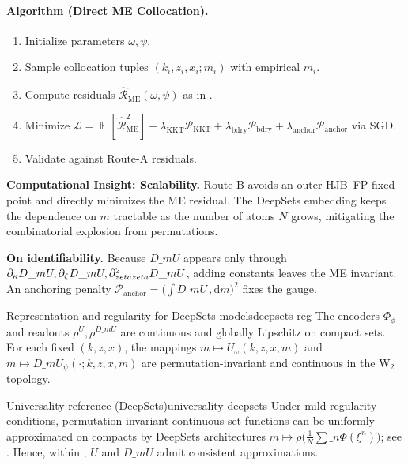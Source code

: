 ﻿\documentclass[11pt,letterpaper,oneside]{article}
\numberwithin{equation}{section}
\DeclareMathOperator{\E}{\mathbb{E}}
\newcommand{\1}{\mathbf{1}}
\newcommand{\diff}{,\mathrm{d}}
\newcommand{\dmU}{D\_m U}
\newcommand{\Dm}{D\_m}
\begin{document}
\paragraph{Algorithm (Direct ME Collocation).}
\begin{enumerate}[leftmargin=1.5em,label=\textbf{B.\arabic*}]
\item Initialize parameters $\omega,\psi$.
\item Sample collocation tuples $(k_i,z_i,x_i; m_i)$ with empirical $m_i$.
\item Compute residuals $\widehat{\mathcal{R}}_{\mathrm{ME}}(\omega,\psi)$ as in .
\item Minimize $\mathcal{L}=\E[\widehat{\mathcal{R}}_{\mathrm{ME}}^2]+\lambda_{\mathrm{KKT}}\mathcal{P}_{\mathrm{KKT}}+\lambda_{\mathrm{bdry}}\mathcal{P}_{\mathrm{bdry}}+\lambda_{\mathrm{anchor}}\mathcal{P}_{\mathrm{anchor}}$ via SGD.
\item Validate against Route-A residuals.
\end{enumerate}

\begin{tcolorbox}[mathstyle]
\textbf{Computational Insight: Scalability.} Route B avoids an outer HJB--FP fixed point and directly minimizes the ME residual. The DeepSets embedding keeps the dependence on $m$ tractable as the number of atoms $N$ grows, mitigating the combinatorial explosion from permutations.
\end{tcolorbox}

\begin{tcolorbox}[mathstyle]
\textbf{On identifiability.} Because $\dmU$ appears only through $\partial_\kappa\dmU, \partial_\zeta\dmU, \partial_{\\zeta\\zeta}^2\dmU$, adding constants leaves the ME invariant. An anchoring penalty $\mathcal{P}_{\mathrm{anchor}}=\big(\int \dmU\,\diff m\big)^2$ fixes the gauge.
\end{tcolorbox}

\begin{assumption}{Representation and regularity for DeepSets models}{deepsets-reg}
The encoders $\Phi_\phi$ and readouts $\rho^U,\rho^{\Dm U}$ are continuous and globally Lipschitz on compact sets. For each fixed $(k,z,x)$, the mappings $m\mapsto U_\omega(k,z,x,m)$ and $m\mapsto \dmU_\psi(\cdot; k,z,x,m)$ are permutation-invariant and continuous in the $\mathrm W_2$ topology.
\end{assumption}

\begin{lemma}{Universality reference (DeepSets)}{universality-deepsets}
Under mild regularity conditions, permutation-invariant continuous set functions can be uniformly approximated on compacts by DeepSets architectures $m\mapsto \rho\big(\tfrac{1}{N}\sum\_n \Phi(\xi^n)\big)$; see \cite{zaheer2017deepsets}. Hence, within , $U$ and $\Dm U$ admit consistent approximations.
\end{lemma}
\end{document}
